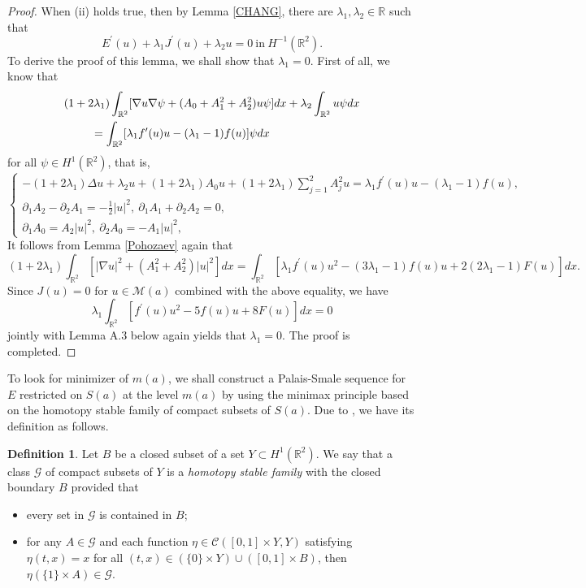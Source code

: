 \documentclass[11pt]{amsart}
\numberwithin{equation}{section}
\theoremstyle{definition}
\newtheorem{definition}[theorem]{Definition}
\newcommand{\R}{\mathbb{R}}
\begin{document}
\begin{proof}
When (ii) holds true, then by Lemma \ref{CHANG}, there are $\lambda_1,\lambda_2\in\R$ such that
\[
E^\prime(u)+\lambda_1J^\prime(u)+\lambda_2u=0~\text{in}~H^{-1}(\R^2).
\]
To derive the proof of this lemma, we shall show that $\lambda_1=0$. First of all, we know that
\[\begin{gathered}
(1+2\lambda_1)\int_{\R^2}[ \nabla u\nabla\psi  + (A_0+A_1^2+A_2^2)u\psi]dx+ \lambda_2\int_{\R^2}u\psi dx\hfill\\
\ \ \ \  \ \ \ \ =\int_{\R^2}[\lambda_1f^\prime(u)u-(\lambda_1-1)f(u)]\psi dx\hfill\\
\end{gathered}\]
for all $\psi\in H^1(\R^2)$, that is,
\[ \left\{
  \begin{array}{ll}
\displaystyle    -(1+2\lambda_1)\Delta u +\lambda_2 u+(1+2\lambda_1)A_0 u+(1+2\lambda_1)
\sum\limits_{j=1}^2A_j^2 u=\lambda_1f^\prime(u)u-(\lambda_1-1)f(u), \\
 \displaystyle     \partial_1A_2-\partial_2A_1=-\frac{1}{2}|u|^2,~\partial_1A_1+\partial_2A_2=0,\\
 \displaystyle    \partial_1A_0=A_2|u|^2,~ \partial_2A_0=-A_1|u|^2,
  \end{array}
\right.
\]
It follows from Lemma \ref{Pohozaev} again that
\[
 (1+2\lambda_1)\int_{\R^2}[|\nabla u|^2 + (A_1^2+A_2^2)|u|^2]dx
 = \int_{\R^2}[\lambda_1f^\prime(u)u^2-(3\lambda_1-1)f(u)u+2(2\lambda_1-1)F(u)]dx.
\]
Since $J(u)=0$ for $u\in \mathcal{M}(a)$ combined with the above equality, we have
\[
\lambda_1\int_{\R^2}[f^\prime(u)u^2-5f(u)u+8F(u)]dx=0
\]
jointly with Lemma A.3 below again yields that $\lambda_1=0$. The proof is completed.
\end{proof}

To look for minimizer of $m(a)$, we shall construct a Palais-Smale sequence for $E$ restricted on $S(a)$
at the level $m(a)$ by using the minimax principle based on the
homotopy stable family of compact subsets of $S(a)$.
Due to \cite{Ghoussoub}, we have its definition as follows.



\begin{definition}\label{homotop}
Let $B$ be a closed subset of a set $Y\subset H^1(\R^2)$. We say that a class $\mathcal{G}$
of compact subsets of $Y$ is a \emph{homotopy stable family} with the closed boundary $B$ provided that
\begin{itemize}
  \item every set in $\mathcal{G}$ is contained in $B$;
  \item for any $A\in \mathcal{G}$ and each function $\eta\in \mathcal{C}([0,1]\times Y,Y)$ satisfying $\eta(t,x)=x$ for all
$(t,x)\in (\{0\}\times Y)\cup([0,1]\times B)$, then $\eta(\{1\}\times A)\in \mathcal{G}$.
\end{itemize}
\end{definition}
\end{document}

